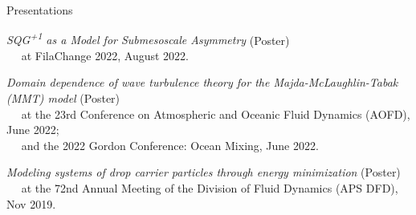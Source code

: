 \documentclass{resume} %
\begin{document}

\begin{rSection}{Presentations}
\begin{etaremune}
 \item \textit{SQG\textsuperscript{+1} as a Model for Submesoscale Asymmetry} (Poster)\\
 $\left.\quad\right.$ at FilaChange 2022, August 2022.
 \item \textit{Domain dependence of wave turbulence theory for the Majda-McLaughlin-Tabak (MMT) model} (Poster)\\
 $\left.\quad\right.$ at the 23rd Conference on Atmospheric and Oceanic Fluid Dynamics (AOFD), June 2022;\\
 $\left.\quad\right.$ and the 2022 Gordon Conference: Ocean Mixing, June 2022.
 \item \textit{Modeling systems of drop carrier particles through energy minimization} (Poster) \\
 $\left.\quad\right.$ at the 72nd Annual Meeting of the Division of Fluid Dynamics (APS DFD), Nov 2019.
\end{etaremune}



\end{rSection}

\end{document}
